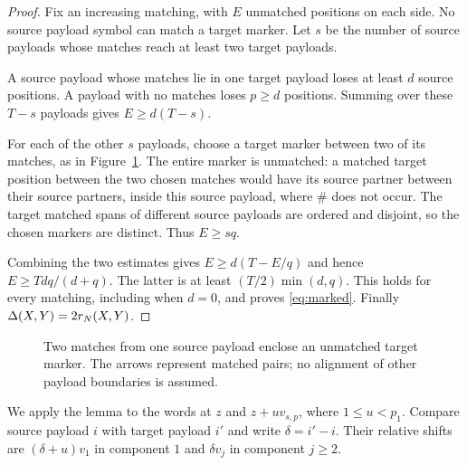 \begin{proof}
Fix an increasing matching, with $E$ unmatched positions on each side.
No source payload symbol can match a target marker. Let $s$ be the
number of source payloads whose matches reach at least two target
payloads.

A source payload whose matches lie in one target payload loses at least
$d$ source positions. A payload with no matches loses $p\ge d$ positions.
Summing over these $T-s$ payloads gives $E\ge d(T-s)$.

For each of the other $s$ payloads, choose a target marker between two
of its matches, as in Figure~\ref{fig:marker}. The entire marker is
unmatched: a matched target
position between the two chosen matches would have its source partner
between their source partners, inside this source payload, where $\#$
does not occur. The target matched spans of different source payloads
are ordered and disjoint, so the chosen markers are distinct. Thus
$E\ge sq$.

Combining the two estimates gives $E\ge d(T-E/q)$ and hence
$E\ge Tdq/(d+q)$. The latter is at least
$(T/2)\min(d,q)$. This holds for every matching, including when $d=0$,
and proves \eqref{eq:marked}. Finally $\Delta(X,Y)=2r_N(X,Y)$.
\end{proof}

\begin{figure}[t]
\centering
{}
\caption{Two matches from one source payload enclose an unmatched target
marker. The arrows represent matched pairs; no alignment of other payload
boundaries is assumed.}\label{fig:marker}
\end{figure}

We apply the lemma to the words at $z$ and $z+uv_{s,p}$, where
$1\le u<p_1$. Compare source payload $i$ with target payload $i'$ and
write $\delta=i'-i$. Their relative shifts are $(\delta+u)v_1$ in
component $1$ and $\delta v_j$ in component $j\ge2$.

